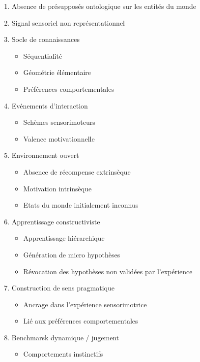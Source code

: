 \begin{enumerate}[itemsep=0pt, parsep=0pt, partopsep=0pt]
	\item Absence de présupposés ontologique sur les entités du monde
	\item Signal sensoriel non représentationnel
	\item Socle de connaissances
	\begin{itemize}[label=\scalebox{.85}{$\diamond$}, itemsep=0pt, topsep=0pt, parsep=0pt, partopsep=0pt]
		\item Séquentialité
		\item Géométrie élémentaire
		\item Préférences comportementales
	\end{itemize}
	\item Evénements d'interaction
	\begin{itemize}[label=\scalebox{.85}{$\diamond$}, itemsep=0pt, topsep=0pt, parsep=0pt, partopsep=0pt]
		\item Schèmes sensorimoteurs
		\item Valence motivationnelle
	\end{itemize} 
	\item Environnement ouvert
	\begin{itemize}[label=\scalebox{.85}{$\diamond$}, itemsep=0pt, topsep=0pt, parsep=0pt, partopsep=0pt]
		\item Absence de récompense extrinsèque
		\item Motivation intrinsèque
		\item Etats du monde initialement inconnus
	\end{itemize} 
	\item Apprentissage constructiviste
	\begin{itemize}[label=\scalebox{.85}{$\diamond$}, itemsep=0pt, topsep=0pt, parsep=0pt, partopsep=0pt]
		\item Apprentissage hiérarchique 
		\item Génération de micro hypothèses
		\item Révocation des hypothèses non validées par l'expérience
	\end{itemize} 
	\item Construction de sens pragmatique
	\begin{itemize}[label=\scalebox{.85}{$\diamond$}, itemsep=0pt, topsep=0pt, parsep=0pt, partopsep=0pt]
		\item Ancrage dans l'expérience sensorimotrice
		\item Lié aux préférences comportementales
	\end{itemize} 
	\item Benchmarsk dynamique / jugement
	\begin{itemize}[label=\scalebox{.85}{$\diamond$}, itemsep=0pt, topsep=0pt, parsep=0pt, partopsep=0pt]
		\item Comportements instinctifs
	\end{itemize} 
\end{enumerate}




